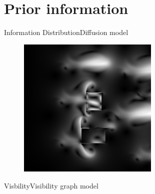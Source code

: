 \section{Prior information}

\begin{frame}{Information Distribution}{Diffusion model}

\begin{figure}
\centering
\includegraphics[width = 0.6\textwidth]{./screenshot/diffusion.png}
\end{figure}

\end{frame}

\begin{frame}{Visbility}{Visibility graph model}



\end{frame}